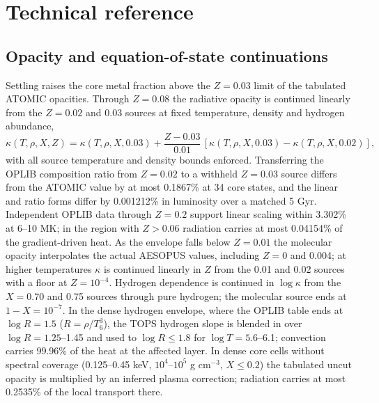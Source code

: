 \section{Technical reference}\label{app:tech}

\subsection*{Opacity and equation-of-state continuations}
Settling raises the core metal fraction above the $Z=0.03$ limit of the
tabulated ATOMIC opacities. Through $Z=0.08$ the radiative opacity is
continued linearly from the $Z=0.02$ and 0.03 sources at fixed temperature,
density and hydrogen abundance,
\begin{equation}
 \kappa(T,\rho,X,Z)=\kappa(T,\rho,X,0.03)
 +\frac{Z-0.03}{0.01}\,[\kappa(T,\rho,X,0.03)-\kappa(T,\rho,X,0.02)],
\end{equation}
with all source temperature and density bounds enforced. Transferring the
OPLIB composition ratio from $Z=0.02$ to a withheld $Z=0.03$ source differs
from the ATOMIC value by at most 0.1867\% at 34 core states, and the linear
and ratio forms differ by 0.001212\% in luminosity over a matched 5 Gyr.
Independent OPLIB data through $Z=0.2$ support linear scaling within
3.302\% at 6--10 MK; in the region with $Z>0.06$ radiation carries at most
0.04154\% of the gradient-driven heat. As the envelope falls below
$Z=0.01$ the molecular opacity interpolates the actual AESOPUS values,
including $Z=0$ and 0.004; at higher temperatures $\kappa$ is continued
linearly in $Z$ from the 0.01 and 0.02 sources with a floor at
$Z=10^{-4}$. Hydrogen dependence is continued in $\log\kappa$ from the
$X=0.70$ and 0.75 sources through pure hydrogen; the molecular source ends
at $1-X=10^{-7}$. In the dense hydrogen envelope, where the OPLIB table
ends at $\log R=1.5$ ($R=\rho/T_6^3$), the TOPS hydrogen slope is blended
in over $\log R=1.25$--1.45 and used to $\log R\leq1.8$ for
$\log T=5.6$--6.1; convection carries 99.96\% of the heat at the affected
layer. In dense core cells without spectral coverage (0.125--0.45 keV,
$10^4$--$10^5$ g cm$^{-3}$, $X\leq0.2$) the tabulated uncut opacity is
multiplied by an inferred plasma correction; radiation carries at most
0.2535\% of the local transport there.

